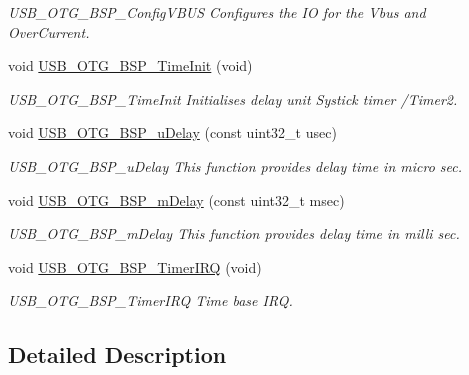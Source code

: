 \begin{DoxyCompactItemize}
\begin{DoxyCompactList}\small\item\em U\-S\-B\-\_\-\-O\-T\-G\-\_\-\-B\-S\-P\-\_\-\-Config\-V\-B\-U\-S Configures the I\-O for the Vbus and Over\-Current. \end{DoxyCompactList}\item 
void \hyperlink{group__USB__BSP__Private__Functions_ga880a11758cfe2348112a30a0ea44c32f}{U\-S\-B\-\_\-\-O\-T\-G\-\_\-\-B\-S\-P\-\_\-\-Time\-Init} (void)
\begin{DoxyCompactList}\small\item\em U\-S\-B\-\_\-\-O\-T\-G\-\_\-\-B\-S\-P\-\_\-\-Time\-Init Initialises delay unit Systick timer /\-Timer2. \end{DoxyCompactList}\item 
void \hyperlink{group__USB__BSP__Private__Functions_gaa70213d9a7b9b047dc6d3357f99e19b5}{U\-S\-B\-\_\-\-O\-T\-G\-\_\-\-B\-S\-P\-\_\-u\-Delay} (const uint32\-\_\-t usec)
\begin{DoxyCompactList}\small\item\em U\-S\-B\-\_\-\-O\-T\-G\-\_\-\-B\-S\-P\-\_\-u\-Delay This function provides delay time in micro sec. \end{DoxyCompactList}\item 
void \hyperlink{group__USB__BSP__Private__Functions_ga28c906bec05a1b7f91aa0e4ff5d8a16c}{U\-S\-B\-\_\-\-O\-T\-G\-\_\-\-B\-S\-P\-\_\-m\-Delay} (const uint32\-\_\-t msec)
\begin{DoxyCompactList}\small\item\em U\-S\-B\-\_\-\-O\-T\-G\-\_\-\-B\-S\-P\-\_\-m\-Delay This function provides delay time in milli sec. \end{DoxyCompactList}\item 
void \hyperlink{group__USB__BSP__Private__Functions_ga97a8f22d2dce112b90488d9afd3fbbdb}{U\-S\-B\-\_\-\-O\-T\-G\-\_\-\-B\-S\-P\-\_\-\-Timer\-I\-R\-Q} (void)
\begin{DoxyCompactList}\small\item\em U\-S\-B\-\_\-\-O\-T\-G\-\_\-\-B\-S\-P\-\_\-\-Timer\-I\-R\-Q Time base I\-R\-Q. \end{DoxyCompactList}\end{DoxyCompactItemize}


\subsection{Detailed Description}


